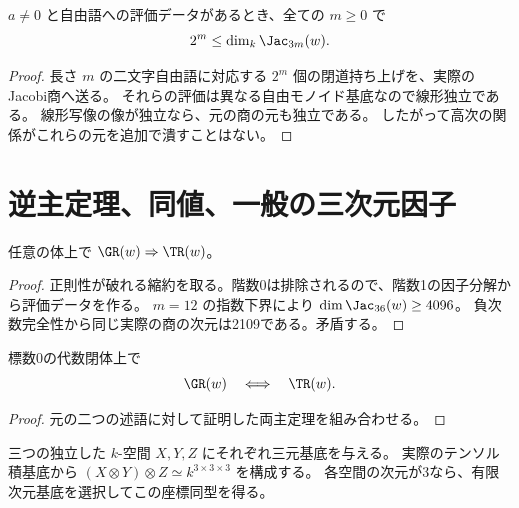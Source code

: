 \begin{theorem}[実際のJacobi商の指数下界]\label{thm:exponential-growth}
\leanok
{}
$a\ne0$ と自由語への評価データがあるとき、全ての $m\ge0$ で
\[
 2^m\le\dim_k\Jac_{3m}(w).
\]
\end{theorem}
\begin{proof}\leanok
長さ $m$ の二文字自由語に対応する $2^m$ 個の閉道持ち上げを、実際のJacobi商へ送る。
それらの評価は異なる自由モノイド基底なので線形独立である。
線形写像の像が独立なら、元の商の元も独立である。
したがって高次の関係がこれらの元を追加で潰すことはない。
\end{proof}

\section{逆主定理、同値、一般の三次元因子}

\begin{theorem}[逆主定理]\label{thm:converse}
\leanok
{}
任意の体上で $\GR(w)\Rightarrow\TR(w)$。
\end{theorem}
\begin{proof}\leanok
正則性が破れる縮約を取る。階数0は排除されるので、階数1の因子分解から評価データを作る。
$m=12$ の指数下界により $\dim\Jac_{36}(w)\ge4096$。
負次数完全性から同じ実際の商の次元は2109である。矛盾する。
\end{proof}

\begin{theorem}[本来の二つの正則性の同値]\label{thm:equivalence}
\leanok
{}
標数0の代数閉体上で
\[
 \GR(w)\quad\Longleftrightarrow\quad\TR(w).
\]
\end{theorem}
\begin{proof}\leanok
元の二つの述語に対して証明した両主定理を組み合わせる。
\end{proof}

\begin{definition}[独立した三つの空間の基底座標]\label{def:bases}
\leanok
{}
三つの独立した $k$-空間 $X,Y,Z$ にそれぞれ三元基底を与える。
実際のテンソル積基底から
$(X\otimes Y)\otimes Z\simeq k^{3\times3\times3}$ を構成する。
各空間の次元が3なら、有限次元基底を選択してこの座標同型を得る。
\end{definition}

